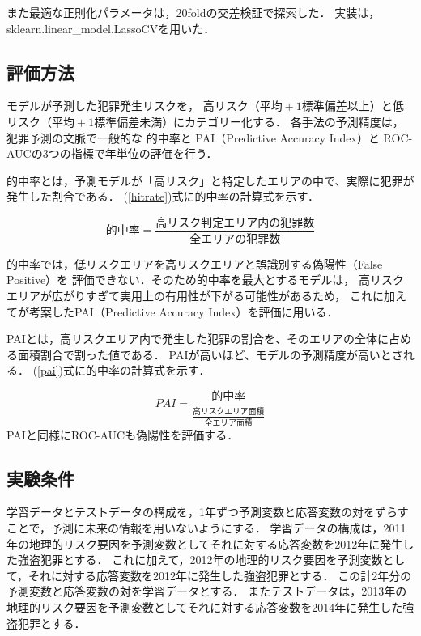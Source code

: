 また最適な正則化パラメータは，20foldの交差検証\cite{islp}で探索した．
実装は，sklearn.linear\_model.LassoCV\cite{scikit-learn}を用いた．
\subsection{評価方法}
モデルが予測した犯罪発生リスクを，
高リスク（$平均+1標準偏差以上$）と低リスク（$平均+1標準偏差未満$）にカテゴリー化する．
各手法の予測精度は，犯罪予測の文脈で一般的な
的中率\cite{joshi2020considerationsdevelopingpredictivemodels}と
PAI（Predictive Accuracy Index）\cite{chainey2008utility}と
ROC-AUC\cite{islp}の3つの指標で年単位の評価を行う．

的中率とは，予測モデルが「高リスク」と特定したエリアの中で、実際に犯罪が発生した割合である．
(\ref{hitrate})式に的中率の計算式を示す．

\begin{equation}\label{hitrate}
  的中率=\frac{高リスク判定エリア内の犯罪数}{全エリアの犯罪数}
\end{equation}

的中率では，低リスクエリアを高リスクエリアと誤識別する偽陽性（False Positive）を
評価できない．そのため的中率を最大とするモデルは，
高リスクエリアが広がりすぎて実用上の有用性が下がる可能性があるため，
これに加えて\cite{chainey2008utility}が考案したPAI（Predictive Accuracy Index）を評価に用いる．

PAIとは，高リスクエリア内で発生した犯罪の割合を、そのエリアの全体に占める面積割合で割った値である．
PAIが高いほど、モデルの予測精度が高いとされる．
(\ref{pai})式に的中率の計算式を示す．

\begin{equation}\label{pai}
  PAI=\frac{的中率}{\frac{高リスクエリア面積}{全エリア面積}}
\end{equation}
PAIと同様にROC-AUCも偽陽性を評価する．

\subsection{実験条件}
学習データとテストデータの構成を，1年ずつ予測変数と応答変数の対をずらすことで，予測に未来の情報を用いないようにする．
学習データの構成は，2011年の地理的リスク要因を予測変数としてそれに対する応答変数を2012年に発生した強盗犯罪とする．
これに加えて，2012年の地理的リスク要因を予測変数として，それに対する応答変数を2012年に発生した強盗犯罪とする．
この計2年分の予測変数と応答変数の対を学習データとする．
またテストデータは，2013年の地理的リスク要因を予測変数としてそれに対する応答変数を2014年に発生した強盗犯罪とする．

